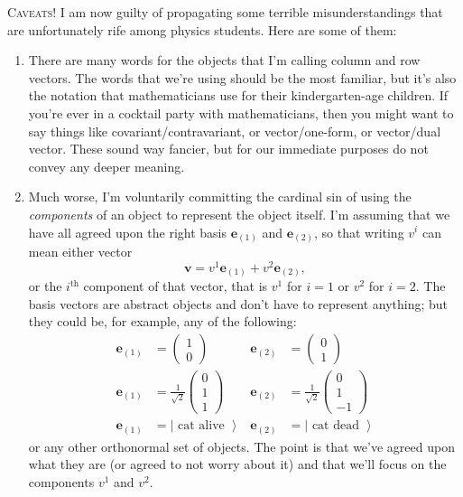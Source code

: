 \documentclass[12pt]{article}
\renewcommand{\vec}[1]{\mathbf{#1}} %
\begin{document}
\begin{framed}
\textsc{Caveats!} I am now guilty of propagating some terrible misunderstandings that are unfortunately rife among physics students. Here are some of them:
\begin{enumerate}
	\item There are many words for the objects that I'm calling column and row vectors. The words that we're using should be the most familiar, but it's also the notation that mathematicians use for their kindergarten-age children. If you're ever in a cocktail party with mathematicians, then you might want to say things like covariant/contravariant, or vector/one-form, or vector/dual vector. These sound way fancier, but for our immediate purposes do not convey any deeper meaning. 
	\item Much worse, I'm voluntarily committing the cardinal sin of using the \emph{components} of an object to represent the object itself. I'm assuming that we have all agreed upon the right basis $\vec{e}_{(1)}$ and $\vec{e}_{(2)}$, so that writing $v^i$ can mean either vector $$\vec{v} = v^1 \vec{e}_{(1)} + v^2 \vec{e}_{(2)},$$ or the $i^\text{th}$ component of that vector, that is $v^1$ for $i=1$ or $v^2$ for $i=2$. The basis vectors are abstract objects and don't have to represent anything; but they could be, for example, any of the following:
\begin{align}
	\vec{e}_{(1)} & = \begin{pmatrix}1\\0\end{pmatrix}
	&
	\vec{e}_{(2)} & = \begin{pmatrix}0\\1\end{pmatrix}
	\\
	\vec{e}_{(1)} & = \frac{1}{\sqrt{2}}\begin{pmatrix}0\\1\\1\end{pmatrix}
	&
	\vec{e}_{(2)} & = \frac{1}{\sqrt{2}}\begin{pmatrix}0\\1\\-1\end{pmatrix}
	\\
	\vec{e}_{(1)} & = \left|\text{ cat alive } \right\rangle
	&
	\vec{e}_{(2)} & = \left|\text{ cat dead } \right\rangle
\end{align}
or any other orthonormal set of objects. The point is that we've agreed upon what they are (or agreed to not worry about it) and that we'll focus on the components $v^1$ and $v^2$.
\end{enumerate}
\end{framed}
\end{document}
